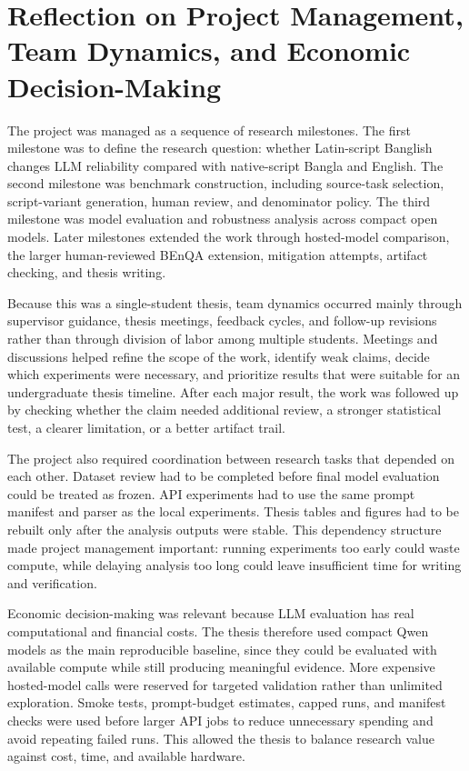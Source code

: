 \section{Reflection on Project Management, Team Dynamics, and Economic Decision-Making}

The project was managed as a sequence of research milestones. The first milestone was to define the research question: whether Latin-script Banglish changes LLM reliability compared with native-script Bangla and English. The second milestone was benchmark construction, including source-task selection, script-variant generation, human review, and denominator policy. The third milestone was model evaluation and robustness analysis across compact open models. Later milestones extended the work through hosted-model comparison, the larger human-reviewed BEnQA extension, mitigation attempts, artifact checking, and thesis writing.

Because this was a single-student thesis, team dynamics occurred mainly through supervisor guidance, thesis meetings, feedback cycles, and follow-up revisions rather than through division of labor among multiple students. Meetings and discussions helped refine the scope of the work, identify weak claims, decide which experiments were necessary, and prioritize results that were suitable for an undergraduate thesis timeline. After each major result, the work was followed up by checking whether the claim needed additional review, a stronger statistical test, a clearer limitation, or a better artifact trail.

The project also required coordination between research tasks that depended on each other. Dataset review had to be completed before final model evaluation could be treated as frozen. API experiments had to use the same prompt manifest and parser as the local experiments. Thesis tables and figures had to be rebuilt only after the analysis outputs were stable. This dependency structure made project management important: running experiments too early could waste compute, while delaying analysis too long could leave insufficient time for writing and verification.

Economic decision-making was relevant because LLM evaluation has real computational and financial costs. The thesis therefore used compact Qwen models as the main reproducible baseline, since they could be evaluated with available compute while still producing meaningful evidence. More expensive hosted-model calls were reserved for targeted validation rather than unlimited exploration. Smoke tests, prompt-budget estimates, capped runs, and manifest checks were used before larger API jobs to reduce unnecessary spending and avoid repeating failed runs. This allowed the thesis to balance research value against cost, time, and available hardware.

